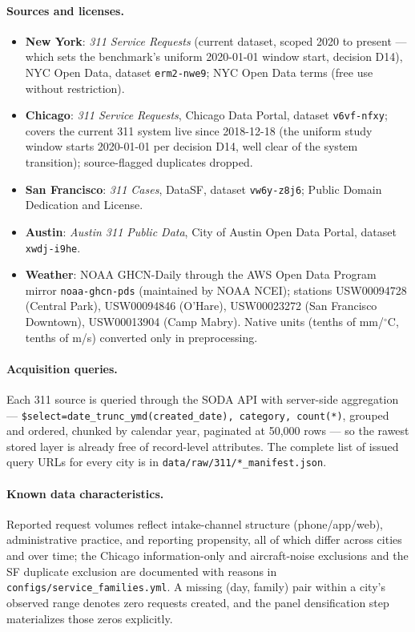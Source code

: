 \paragraph{Sources and licenses.}
\begin{itemize}
\item \textbf{New York}: \emph{311 Service Requests} (current dataset,
scoped 2020 to present --- which sets the benchmark's uniform 2020-01-01
window start, decision D14), NYC Open Data, dataset \texttt{erm2-nwe9};
NYC Open Data terms (free use without restriction).
\item \textbf{Chicago}: \emph{311 Service Requests}, Chicago Data Portal,
dataset \texttt{v6vf-nfxy}; covers the current 311 system live since
2018-12-18 (the uniform study window starts 2020-01-01 per decision D14,
well clear of the system
transition); source-flagged duplicates dropped.
\item \textbf{San Francisco}: \emph{311 Cases}, DataSF, dataset
\texttt{vw6y-z8j6}; Public Domain Dedication and License.
\item \textbf{Austin}: \emph{Austin 311 Public Data}, City of Austin Open
Data Portal, dataset \texttt{xwdj-i9he}.
\item \textbf{Weather}: NOAA GHCN-Daily through the AWS Open Data Program
mirror \texttt{noaa-ghcn-pds} (maintained by NOAA NCEI); stations
USW00094728 (Central Park), USW00094846 (O'Hare), USW00023272 (San
Francisco Downtown), USW00013904 (Camp Mabry). Native units (tenths of
mm/$^\circ$C, tenths of m/s) converted only in preprocessing.
\end{itemize}

\paragraph{Acquisition queries.} Each 311 source is queried through the
SODA API with server-side aggregation —
\texttt{\$select=date\_trunc\_ymd(created\_date), category, count(*)},
grouped and ordered, chunked by calendar year, paginated at 50{,}000
rows — so the rawest stored layer is already free of record-level
attributes. The complete list of issued query URLs for every city is in
\texttt{data/raw/311/*\_manifest.json}.

\paragraph{Known data characteristics.} Reported request volumes reflect
intake-channel structure (phone/app/web), administrative practice, and
reporting propensity, all of which differ across cities and over time;
the Chicago information-only and aircraft-noise exclusions and the SF
duplicate exclusion are documented with reasons in
\texttt{configs/service\_families.yml}. A missing (day, family) pair
within a city's observed range denotes zero requests created, and the
panel densification step materializes those zeros explicitly.
